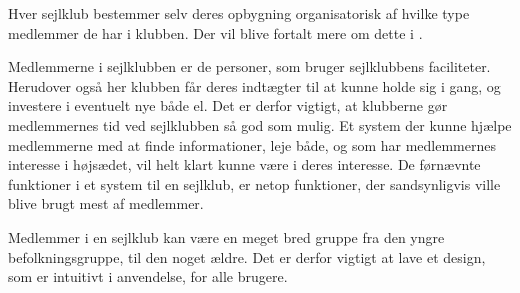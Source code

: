 Hver sejlklub bestemmer selv deres opbygning organisatorisk af hvilke type medlemmer de har i klubben.  Der vil blive
fortalt mere om dette i . 

Medlemmerne i sejlklubben er de personer, som bruger sejlklubbens faciliteter. Herudover også her klubben får deres
indtægter til at kunne holde sig i gang, og investere i eventuelt nye både el.  Det er derfor vigtigt, at klubberne gør medlemmernes tid ved sejlklubben
så god som mulig. Et system der kunne hjælpe medlemmerne med at finde informationer, leje både, og som har
medlemmernes interesse i højsædet, vil helt klart kunne være i deres interesse. De førnævnte funktioner i et system til
en sejlklub, er netop funktioner, der sandsynligvis ville blive brugt mest af medlemmer.

Medlemmer i en sejlklub kan være en meget bred gruppe fra den yngre befolkningsgruppe, til den noget ældre. Det er
derfor vigtigt at lave et design, som er intuitivt i anvendelse, for alle brugere. 






